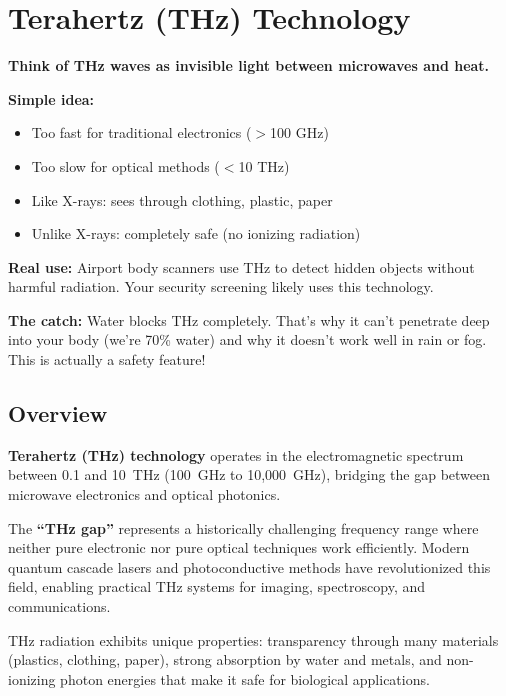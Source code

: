 \chapter{Terahertz (THz) Technology}
\label{ch:thz}

\begin{nontechnical}
\textbf{Think of THz waves as invisible light between microwaves and heat.}

\textbf{Simple idea:}
\begin{itemize}
\item Too fast for traditional electronics ($>$100 GHz)
\item Too slow for optical methods ($<$10 THz)
\item Like X-rays: sees through clothing, plastic, paper
\item Unlike X-rays: completely safe (no ionizing radiation)
\end{itemize}

\textbf{Real use:} Airport body scanners use THz to detect hidden objects without harmful radiation. Your security screening likely uses this technology.

\textbf{The catch:} Water blocks THz completely. That's why it can't penetrate deep into your body (we're 70\% water) and why it doesn't work well in rain or fog. This is actually a safety feature!
\end{nontechnical}

\section{Overview}

\textbf{Terahertz (THz) technology} operates in the electromagnetic spectrum between 0.1 and 10~THz (100~GHz to 10,000~GHz), bridging the gap between microwave electronics and optical photonics.

\begin{keyconcept}
The \textbf{``THz gap''} represents a historically challenging frequency range where neither pure electronic nor pure optical techniques work efficiently. Modern quantum cascade lasers and photoconductive methods have revolutionized this field, enabling practical THz systems for imaging, spectroscopy, and communications.
\end{keyconcept}

THz radiation exhibits unique properties: transparency through many materials (plastics, clothing, paper), strong absorption by water and metals, and non-ionizing photon energies that make it safe for biological applications.

